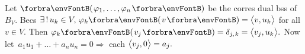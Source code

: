 
Let $\Par{\varphi_1,\dots,\varphi_n}$ be the corres dual bss of $B_V.$ \;Becs $\exists\,!\,u_k\in V,\,\varphi_k\Par{v}=\Ang{v,u_k}$ for all $v\in V.$\parSol{}
Then $\varphi_k\Par{v_j}=\delta_{j,\;\!k}=\Ang{v_j,u_k}.$ \;Now let \,$a_1u_1+\dots+a_nu_n=0\Rightarrow$ each $\big\langle{}v_j,0{}\big\rangle=a_j.$\PfEnd
\SepLine

